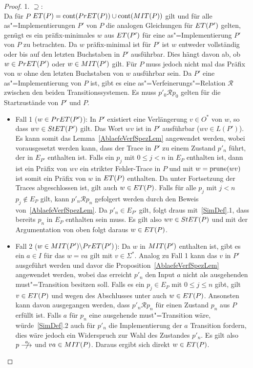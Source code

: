 \begin{proof}
  1. \glqq$\supseteq$\grqq{}:\\
  Da für $P$ $ET (P) = \mathrm{cont} (PrET (P)) \cup \mathrm{cont} (MIT (P))$ gilt und für
  alle as"=Implementierungen $P'$ von $P$ die analogen Gleichungen für $ET
  (P')$ gelten, genügt es ein präfix-minimales $w$ aus $ET (P')$ für eine
  as"=Implementierung $P'$ von $P$ zu betrachten. Da $w$ präfix-minimal ist für
  $P'$ ist $w$ entweder vollständig oder bis auf den letzten Buchstaben in $P'$
  ausführbar. Dies hängt davon ab, ob $w\in PrET (P')$ oder $w\in MIT (P')$
  gilt. Für $P$ muss jedoch nicht mal das Präfix von $w$ ohne den letzten
  Buchstaben von $w$ ausführbar sein. Da $P'$ eine as"=Implementierung von $P$
  ist, gibt es eine as"=Verfeinerungs"=Relation $\mathcal{R}$ zwischen den
  beiden Transitionssystemen. Es muss $p'_0\mathcal{R}p_0$ gelten für die
  Startzustände von $P'$ und $P$.
  \begin{itemize}
    \item Fall 1 ($w\in PrET (P')$): In $P'$ existiert eine Verlängerung $v\in
      O^*$ von $w$, so dass $wv\in StET (P')$ gilt. Das Wort $wv$ ist in $P'$
      ausführbar ($wv\in L(P')$). Es kann somit das
      Lemma~\ref{AblaefeVerfSpezLem} angewendet werden, wobei
      vorausgesetzt werden kann, dass der Trace in $P'$ zu einem Zustand $p'_n$
      führt, der in $E_{P'}$ enthalten ist. Falls ein $p_j$ mit $0\leq j < n$
      in $E_P$ enthalten ist, dann ist ein Präfix von $wv$ ein strikter
      Fehler-Trace in $P$ und mit $w=\mathrm{prune}(wv)$ ist somit ein Präfix von $w$
      in $ET (P)$ enthalten. Da \ET{} unter Fortsetzung der Traces
      abgeschlossen ist, gilt auch $w\in ET (P)$. Falls für alle $p_j$ mit $j
      < n$ $p_j\notin E_P$ gilt, kann $p'_n \mathcal{R} p_n$ gefolgert werden
      durch den Beweis von~\ref{AblaefeVerfSpezLem}. Da $p'_n\in E_{P'}$ gilt,
      folgt draus mit~\ref{SimDef}.1, dass bereits $p_n$ in $E_P$ enthalten
      sein muss. Es gilt also $wv\in StET (P)$ und mit der Argumentation von
      oben folgt daraus $w\in ET (P)$.
    \item Fall 2 ($w\in MIT (P')\backslash PrET (P')$): Da $w$ in $MIT (P')$
      enthalten ist, gibt es ein $a\in I$ für das $w=va$ gilt mit $v\in\Sigma
      ^*$. Analog zu Fall 1 kann das $v$ in $P'$ ausgeführt werden und davor
      die Proposition~\ref{AblaefeVerfSpezLem} angewendet werden, wobei das
      erreicht $p'_n$ den Input $a$ nicht als ausgehenden must"=Transition
      besitzen soll. Falls es ein $p_j\in E_P$ mit $0\leq j \leq n$ gibt, gilt
      $v\in ET (P)$ und wegen des Abschlusses unter \cont{} auch $w\in ET (P)$.
      Ansonsten kann davon ausgegangen werden, dass $p'_n \mathcal{R} p_n$ für
      einen Zustand $p_n$ aus $P$ erfüllt ist. Falls $a$ für $p_n$ eine
      ausgehende must"=Transition wäre, würde~\ref{SimDef}.2 auch für $p'_n$
      die Implementierung der $a$ Transition fordern, dies wäre jedoch ein
      Widerspruch zur Wahl des Zustandes $p'_n$. Es gilt also $p\nmust[a]$ und
      $va\in MIT (P)$. Daraus ergibt sich direkt $w\in ET (P)$.
  \end{itemize}


\end{proof}

